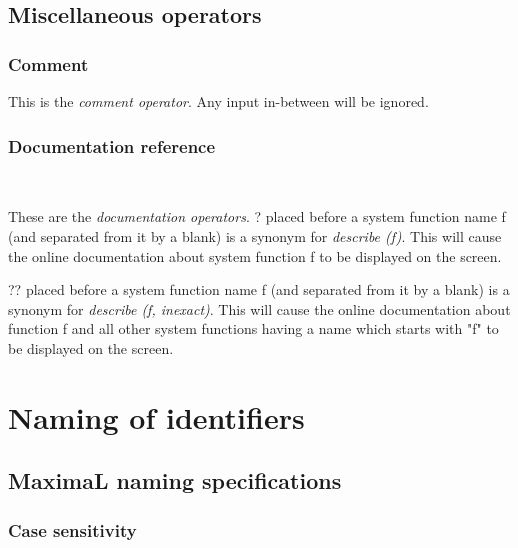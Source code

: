 \documentclass[../Maxima_Workbook.tex]{subfiles}
\begin{document}
\subsection{Miscellaneous operators}

\subsubsection{Comment}

 \hfill {}

\lz This is the \emph{comment operator}.  Any input in-between will be ignored.

\subsubsection{Documentation reference}

\lzz {} \hfill {} \\
 \hfill {}

\lz These are the \emph{documentation operators}. ? placed before a system function name f (and separated from it by a blank) is a synonym for \emph{describe (f)}. This will cause the online documentation about system function f to be displayed on the screen.

\lz ?? placed before a system function name f (and separated from it by a blank) is a synonym for \emph{describe (f, inexact)}. This will cause the online documentation about function f and all other system functions having a name which starts with "f" to be displayed on the screen.

\section{Naming of identifiers}

\subsection{MaximaL naming specifications}

\subsubsection{Case sensitivity}
\end{document}
